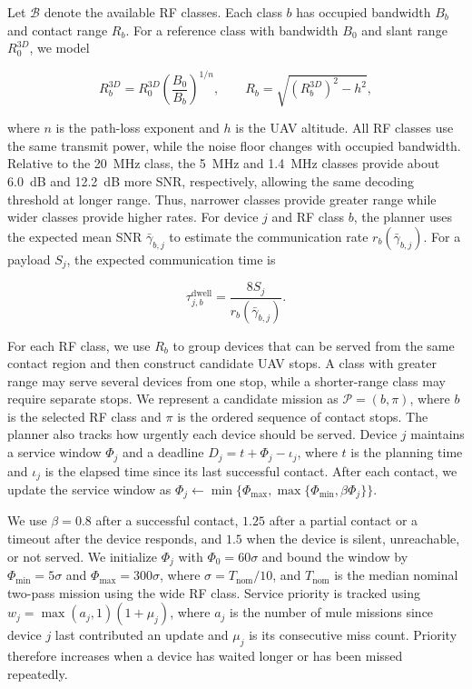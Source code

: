 \documentclass[conference]{IEEEtran}
\begin{document}
Let $\mathcal{B}$ denote the available RF classes. Each class $b$ has occupied
bandwidth $B_b$ and contact range $R_b$. For a reference class with bandwidth
$B_0$ and slant range $R_0^{3D}$, we model

\begin{equation}
R_b^{3D}
=
R_0^{3D}
\left(\frac{B_0}{B_b}\right)^{1/n},
\qquad
R_b =
\sqrt{\left(R_b^{3D}\right)^2-h^2},
\label{eq:contact-range}
\end{equation}

where $n$ is the path-loss exponent and $h$ is the UAV altitude. All RF classes
use the same transmit power, while the noise floor changes with occupied
bandwidth. Relative to the 20~MHz class, the 5~MHz and 1.4~MHz classes provide
about 6.0~dB and 12.2~dB more SNR, respectively, allowing the same decoding threshold at longer
range. Thus, narrower classes provide greater range while wider classes provide
higher rates. For device $j$ and RF class $b$, the planner uses the expected mean SNR
$\bar{\gamma}_{b,j}$ to estimate the communication rate
$r_b(\bar{\gamma}_{b,j})$. For a payload $S_j$, the expected
communication time is

\begin{equation}
\tau_{j,b}^{\mathrm{dwell}}
=
\frac{8S_j}{r_b(\bar{\gamma}_{b,j})}.
\label{eq:dwell}
\end{equation}

For each RF class, we use $R_b$ to group devices that can be served from the
same contact region and then construct candidate UAV stops. A class with greater range may
serve several devices from one stop, while a shorter-range class may require
separate stops. We represent a candidate mission as $\mathcal{P}=(b,\pi)$, where $b$ is the selected RF class and $\pi$ is the ordered sequence of contact stops. The planner also tracks how urgently each device should be served. Device $j$
maintains a service window $\Phi_j$ and a deadline $D_j=t+\Phi_j-\iota_j$, where $t$ is the planning time and $\iota_j$ is the elapsed time since its last
successful contact. After each contact, we update the service window as $\Phi_j
\leftarrow
\min\{\Phi_{\max},
\max\{\Phi_{\min},\beta\Phi_j\}\}$.

We use $\beta=0.8$ after a successful contact, $1.25$ after a partial contact or
a timeout after the device responds, and $1.5$ when the device is silent,
unreachable, or not served. We initialize $\Phi_j$ with
$\Phi_0=60\sigma$ and bound the window by
$\Phi_{\min}=5\sigma$ and $\Phi_{\max}=300\sigma$, where
$\sigma=T_{\mathrm{nom}}/10$, and $T_{\mathrm{nom}}$ is the median nominal
two-pass mission using the wide RF class. Service priority is tracked using
$w_j=\max(a_j,1)(1+\mu_j)$, where $a_j$ is the number of mule missions since device $j$ last contributed an
update and $\mu_j$ is its consecutive miss count. Priority therefore increases when a device has waited longer or has been
missed repeatedly.
\end{document}
